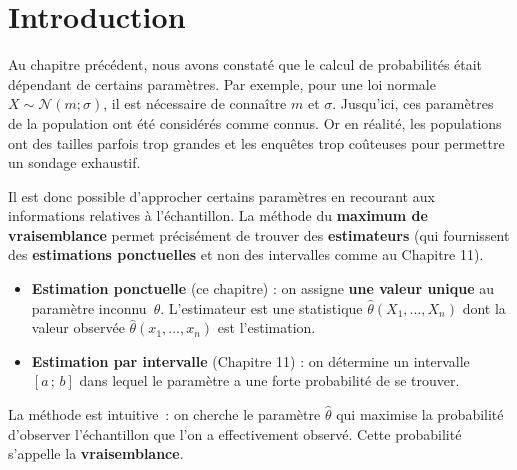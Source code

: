 \documentclass[11pt,a4paper]{article}
\newcommand{\N}{\mathcal{N}}
\begin{document}
\newpage

\thispagestyle{empty}
{\hypersetup{linkcolor=textprimary}
\tableofcontents}
\newpage

\section*{Introduction}

Au chapitre pr\'ec\'edent, nous avons constat\'e que le calcul de probabilit\'es \'etait d\'ependant de certains param\`etres. Par exemple, pour une loi normale $X\sim\N(m;\sigma)$, il est n\'ecessaire de conna\^itre $m$ et $\sigma$. Jusqu'ici, ces param\`etres de la population ont \'et\'e consid\'er\'es comme connus. Or en r\'ealit\'e, les populations ont des tailles parfois trop grandes et les enqu\^etes trop co\^uteuses pour permettre un sondage exhaustif.

Il est donc possible d'approcher certains param\`etres en recourant aux informations relatives \`a l'\'echantillon. La m\'ethode du \textbf{maximum de vraisemblance} permet pr\'ecis\'ement de trouver des \textbf{estimateurs} (qui fournissent des \textbf{estimations ponctuelles} et non des intervalles comme au Chapitre 11).

\begin{defbox}
\begin{itemize}
  \item \textbf{Estimation ponctuelle} (ce chapitre) : on assigne \textbf{une valeur unique} au param\`etre inconnu~$\theta$. L'estimateur est une statistique $\hat\theta(X_1,\ldots,X_n)$ dont la valeur observ\'ee $\hat\theta(x_1,\ldots,x_n)$ est l'estimation.
  \item \textbf{Estimation par intervalle} (Chapitre 11) : on d\'etermine un intervalle $[a\,;\,b]$ dans lequel le param\`etre a une forte probabilit\'e de se trouver.
\end{itemize}
\end{defbox}

La m\'ethode est intuitive~: on cherche le param\`etre $\hat\theta$ qui maximise la probabilit\'e d'observer l'\'echantillon que l'on a effectivement observ\'e. Cette probabilit\'e s'appelle la \textbf{vraisemblance}.

\end{document}
